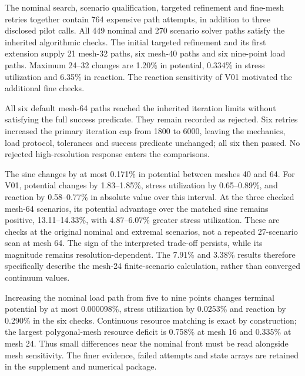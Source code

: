 The nominal search, scenario qualification, targeted refinement and fine-mesh retries together contain 764 expensive path attempts, in addition to three disclosed pilot calls. All 449 nominal and 270 scenario solver paths satisfy the inherited algorithmic checks. The initial targeted refinement and its first extension supply 21 mesh-32 paths, six mesh-40 paths and six nine-point load paths. Maximum 24--32 changes are 1.20\% in potential, 0.334\% in stress utilization and 6.35\% in reaction. The reaction sensitivity of V01 motivated the additional fine checks.

All six default mesh-64 paths reached the inherited iteration limits without satisfying the full success predicate. They remain recorded as rejected. Six retries increased the primary iteration cap from 1800 to 6000, leaving the mechanics, load protocol, tolerances and success predicate unchanged; all six then passed. No rejected high-resolution response enters the comparisons.

The sine changes by at most 0.171\% in potential between meshes 40 and 64. For V01, potential changes by 1.83--1.85\%, stress utilization by 0.65--0.89\%, and reaction by 0.58--0.77\% in absolute value over this interval. At the three checked mesh-64 scenarios, its potential advantage over the matched sine remains positive, 13.11--14.33\%, with 4.87--6.07\% greater stress utilization. These are checks at the original nominal and extremal scenarios, not a repeated 27-scenario scan at mesh 64. The sign of the interpreted trade-off persists, while its magnitude remains resolution-dependent. The 7.91\% and 3.38\% results therefore specifically describe the mesh-24 finite-scenario calculation, rather than converged continuum values.

Increasing the nominal load path from five to nine points changes terminal potential by at most 0.000098\%, stress utilization by 0.0253\% and reaction by 0.290\% in the six checks. Continuous resource matching is exact by construction; the largest polygonal-mesh resource deficit is 0.758\% at mesh 16 and 0.335\% at mesh 24. Thus small differences near the nominal front must be read alongside mesh sensitivity. The finer evidence, failed attempts and state arrays are retained in the supplement and numerical package.
